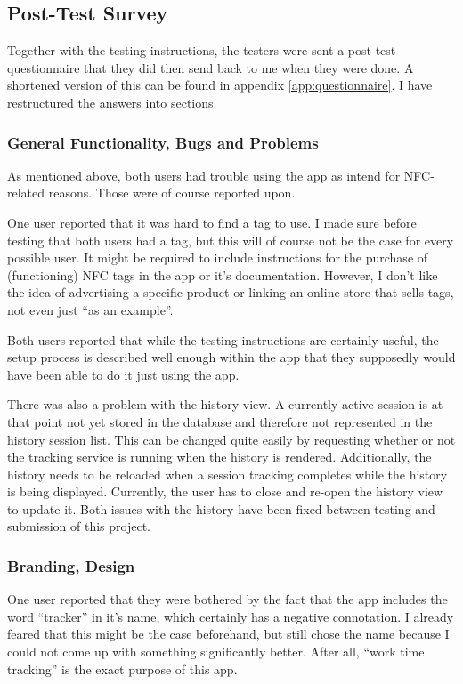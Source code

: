 \documentclass[conference]{IEEEtran}
\begin{document}
\subsection{Post-Test Survey}
Together with the testing instructions, the testers were sent a post-test questionnaire that they did then send back to me when they were done. A shortened version of this can be found in appendix \ref{app:questionnaire}. I have restructured the answers into sections.

\subsubsection{General Functionality, Bugs and Problems}
As mentioned above, both users had trouble using the app as intend for NFC-related reasons. Those were of course reported upon.

One user reported that it was hard to find a tag to use. I made sure before testing that both users had a tag, but this will of course not be the case for every possible user. It might be required to include instructions for the purchase of (functioning) NFC tags in the app or it's documentation. However, I don't like the idea of advertising a specific product or linking an online store that sells tags, not even just ``as an example''.

Both users reported that while the testing instructions are certainly useful, the setup process is described well enough within the app that they supposedly would have been able to do it just using the app.

There was also a problem with the history view. A currently active session is at that point not yet stored in the database and therefore not represented in the history session list. This can be changed quite easily by requesting whether or not the tracking service is running when the history is rendered. Additionally, the history needs to be reloaded when a session tracking completes while the history is being displayed. Currently, the user has to close and re-open the history view to update it. Both issues with the history have been fixed between testing and submission of this project.

\subsubsection{Branding, Design}
One user reported that they were bothered by the fact that the app includes the word ``tracker'' in it's name, which certainly has a negative connotation. I already feared that this might be the case beforehand, but still chose the name because I could not come up with something significantly better. After all, ``work time tracking'' is the exact purpose of this app.
\end{document}
